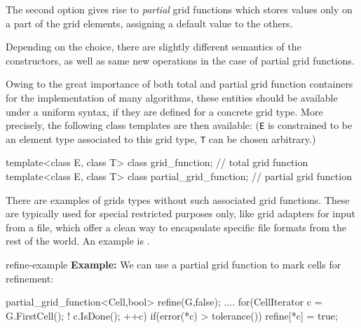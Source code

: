       The second option gives rise to  {\em partial\/}
      grid functions     
      which stores values  only on a part of the grid elements,
      assigning a default value to the others.
      
      Depending on the choice, there are slightly different semantics of the constructors,
      as well as same new operations in the case of  partial grid functions.
      
      Owing to the great importance of both total and partial grid function containers
      for the implementation of many algorithms, these entities should be 
      available under a uniform syntax, if they are defined for a concrete grid type.
      More precisely, the following class templates are then available: 
     {\small ({\tt E} is constrained to be an element type  
      associated to this grid type, {\tt T} can be chosen arbitrary.)}
     
\begin{example}
template<class E, class T> 
class grid\_function; // total grid function 
template<class E, class T>
class partial\_grid\_function; // partial grid function
\end{example}

There are examples of grids types without such associated grid functions.
These are typically used for special restricted purposes only,
like grid adapters for input from a file, which offer a clean way 
to encapsulate specific file formats from the rest of the world.
An example is 
.

\begin{Label}{refine-example}
{\bf Example:}
We can use  a partial grid function to mark cells for refinement:
\begin{example}
partial\_grid\_function<Cell,bool> refine(G,false);
....
for(CellIterator c = G.FirstCell(); ! c.IsDone(); ++c)
 if(error(*c) > tolerance())
   refine[*c] = true;
\end{example}
\end{Label}
